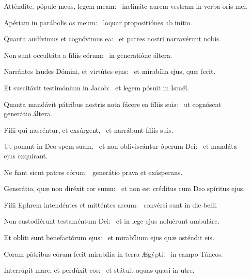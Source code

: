 \item Atténdite, pópule meus, legem meam:~\psstar{} inclináte aurem vestram in verba oris mei.

\item Apériam in parábolis os meum:~\psstar{} loquar propositiónes ab inítio.

\item Quanta audívimus et cognóvimus ea:~\psstar{} et patres nostri narravérunt nobis.

\item Non sunt occultáta a fíliis eórum:~\psstar{} in generatióne áltera.

\item Narrántes laudes Dómini, et virtútes ejus:~\psstar{} et mirabília ejus, quæ fecit.

\item Et suscitávit testimónium in Jacob:~\psstar{} et legem pósuit in Israël.

\item Quanta mandávit pátribus nostris nota fácere ea fíliis suis:~\psstar{} ut cognóscat generátio áltera.

\item Fílii qui nascéntur, et exsúrgent,~\psstar{} et narrábunt fíliis suis.

\item Ut ponant in Deo spem suam,~\pscross{} et non obliviscántur óperum Dei:~\psstar{} et mandáta ejus exquírant.

\item Ne fiant sicut patres eórum:~\psstar{} generátio prava et exásperans.

\item Generátio, quæ non diréxit cor suum:~\psstar{} et non est créditus cum Deo spíritus ejus.

\item Fílii Ephrem intendéntes et mitténtes arcum:~\psstar{} convérsi sunt in die belli.

\item Non custodiérunt testaméntum Dei:~\psstar{} et in lege ejus noluérunt ambuláre.

\item Et oblíti sunt benefactórum ejus:~\psstar{} et mirabílium ejus quæ osténdit eis.

\item Coram pátribus eórum fecit mirabília in terra Ægýpti:~\psstar{} in campo Táneos.

\item Interrúpit mare, et perdúxit eos:~\psstar{} et státuit aquas quasi in utre.

